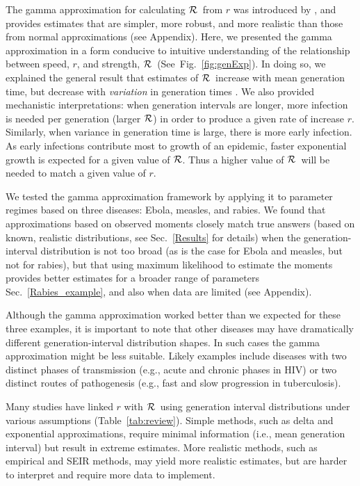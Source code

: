 \documentclass[12pt]{article}
\newcommand{\RR}{\ensuremath{{\cal R}}}
\newcommand{\fref}[1]{Fig.~\ref{fig:#1}}
\newcommand{\sref}[1]{Sec.~\ref{#1}}
\newcommand{\tref}[1]{Table~\ref{tab:#1}}
\begin{document}
The gamma approximation for calculating \RR\ from $r$ was introduced by \cite{NishCast09}, and provides estimates that are simpler, more robust, and more realistic than those from normal approximations (see Appendix).
Here, we presented the gamma approximation in a form conducive to intuitive understanding of the relationship between speed, $r$, and strength, \RR\ (See~\fref{genExp}).
In doing so, we explained the general result that estimates of \RR\ increase with mean generation time, but decrease with \emph{variation} in generation times \cite{WallLips07, wearing2005appropriate, roberts2007model}.
We also provided mechanistic interpretations: when generation intervals are longer, more infection is needed per generation (larger \RR)  in order to produce a given rate of increase $r$. 
Similarly, when variance in generation time is large, there is more early infection.
As early infections contribute most to growth of an epidemic, faster exponential growth is expected for a given value of \RR.
Thus a higher value of \RR\ will be needed to match a given value of $r$. 

We tested the gamma approximation framework by applying it to parameter regimes based on three diseases: Ebola, measles, and rabies. 
We found that approximations based on observed moments closely match true answers (based on known, realistic distributions, see \sref{Results} for details) when the generation-interval distribution is not too broad (as is the case for Ebola and measles, but not for rabies), but that using maximum likelihood to estimate the moments provides better estimates for a broader range of parameters \sref{Rabies_example}, and also when data are limited (see Appendix).

Although the gamma approximation worked better than we expected for these three examples, it is important to note that other diseases may have dramatically different generation-interval distribution shapes. 
In such cases the gamma approximation might be less suitable. 
Likely examples include diseases with two distinct phases of transmission (e.g., acute and chronic phases in HIV) or two distinct routes of pathogenesis (e.g., fast and slow progression in tuberculosis).

Many studies have linked $r$ with \RR\ using generation interval distributions under various assumptions (\tref{review}).
Simple methods, such as delta and exponential approximations, require minimal information (i.e., mean generation interval) but result in extreme estimates. 
More realistic methods, such as empirical and SEIR methods, may yield more realistic estimates, but are harder to interpret and require more data to implement. 
\end{document}
